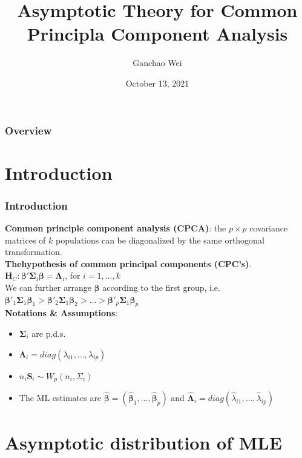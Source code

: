 \documentclass{beamer}
\title[CPCA inference]{Asymptotic Theory for Common Principla Component Analysis}
\author{Ganchao Wei}
\date{October 13, 2021}
\begin{document}
	
	\begin{frame}
		\titlepage %
	\end{frame}
	
	\begin{frame}
		\frametitle{Overview} %
		\tableofcontents
	\end{frame}
	
	
	\section{Introduction}
	
	\begin{frame}
		\frametitle{Introduction}
		\textbf{Common principle component analysis (CPCA)}: the $p\times p$ covariance matrices of $k$ populations can be diagonalized by the same orthogonal transformation.\\
		\textbf{Thehypothesis of common principal components (CPC's)}.  $\bm{H}_C: \bm{\beta}'\bm{\Sigma}_i\bm{\beta}= \bm{\Lambda}_i$, for $i=1,\ldots,k$\\
		We can further arrange $\bm{\beta}$ according to the first group, i.e. $\bm{\beta}'_1\bm{\Sigma}_1\bm{\beta}_1 > \bm{\beta}'_2\bm{\Sigma}_1\bm{\beta}_2 > \ldots > \bm{\beta}'_p\bm{\Sigma}_1\bm{\beta}_p$\\
		
		\textbf{Notations \& Assumptions}:
		\begin{itemize}
			\item 
			$\bm{\Sigma}_i$ are p.d.s.
			\item
			$\bm{\Lambda}_i = diag(\lambda_{i1},\ldots,\lambda_{ip})$
			\item
			$n_i\bm{S}_i \sim W_p(n_i, \Sigma_i)$
			\item
			The ML estimates are $\hat{\bm{\beta}} = (\hat{\bm{\beta}}_1,\ldots, \hat{\bm{\beta}}_p)$ and $\hat{\bm{\Lambda}}_i = diag(\hat{\lambda}_{i1},\ldots,\hat{\lambda}_{ip})$
		\end{itemize}
	\end{frame}

	\section{Asymptotic distribution of MLE}
\end{document}
